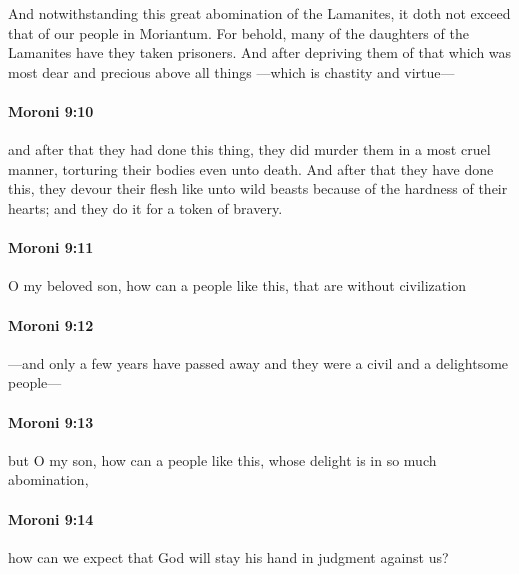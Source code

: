 			And notwithstanding this great abomination of the Lamanites,
			it doth not exceed that of our people in Moriantum.
			For behold, many of the daughters of the Lamanites have they taken prisoners.
			And after depriving them of that
			which was most dear and precious above all things
			---which is chastity and virtue---

		\paragraph{Moroni 9:10} %
			\label{MORONI-9-10}

			and after that they had done this thing,
			they did murder them in a most cruel manner,
			torturing their bodies even unto death.
			And after that they have done this,
			they devour their flesh like unto wild beasts
			because of the hardness of their hearts;
			and they do it for a token of bravery.

		\paragraph{Moroni 9:11} %
			\label{MORONI-9-11}

			O my beloved son,
			how can a people like this,
			that are without civilization

		\paragraph{Moroni 9:12} %
			\label{MORONI-9-12}

			---and only a few years have passed away
			and they were a civil and a delightsome people---

		\paragraph{Moroni 9:13} %
			\label{MORONI-9-13}

			but O my son,
			how can a people like this,
			whose delight is in so much abomination,

		\paragraph{Moroni 9:14} %
			\label{MORONI-9-14}

			how can we expect
			that God will stay his hand in judgment against us?

